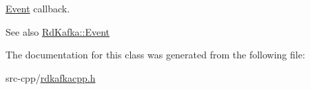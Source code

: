 \hyperlink{classRdKafka_1_1Event}{Event} callback. \begin{DoxySeeAlso}{See also}
\hyperlink{classRdKafka_1_1Event}{RdKafka::Event} 
\end{DoxySeeAlso}


The documentation for this class was generated from the following file:\begin{DoxyCompactItemize}
\item 
src-\/cpp/\hyperlink{rdkafkacpp_8h}{rdkafkacpp.h}\end{DoxyCompactItemize}
